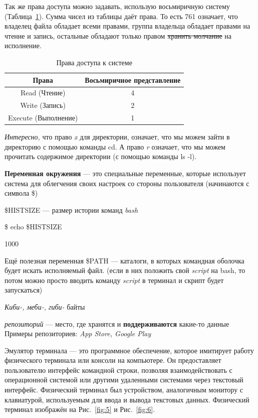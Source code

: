\documentclass[oneside, final, 14pt]{extreport} %
\begin{document}
Так же права доступа можно задавать, использую восьмиричную систему (Таблица~\ref{table:1}).
Сумма чисел из таблицы даёт права. То есть 761 означает, что владелец файла обладает всеми 
правами, группа владельца обладает правами на чтение и запись, остальные обладают только 
правом \sout{хранить молчание} на исполнение.



\begin{table}[h]
    \centering
    \begin{tabular}{|c|c|}
    \hline
    Права & Восьмиричное представление\\ 
    \hline
    Read (Чтение) & 4 \\ 
    \hline
    Write (Запись) & 2 \\
    \hline
    Execute (Выполнение) & 1 \\
    \hline
    \end{tabular}
    \caption{Права доступа к системе}
    \label{table:1}
\end{table}

\textit{Интересно,} что право \textit{x} для директории, означает, что мы можем зайти в директорию 
с помощью команды cd. А право \textit{r} означает, что мы можем прочитать содержимое директории (с 
помощью команды ls -l).



\textbf{Переменная окружения} --- это специальные переменные, которые использует система для
облегчения своих настроек со стороны пользователя (начинаются с символа \$) 

\$HISTSIZE --- размер истории команд \textit{bash}

\$ echo \$HISTSIZE 

1000

\vspace{\baselineskip}

Ещё полезная переменная \$PATH --- каталоги, в которых командная оболочка 
будет искать исполняемый файл. (если в них положить свой \textit{script} на bash,
то потом можно просто вводить команду \textit{script} в терминал и скрипт будет запускаться)

\textit{Киби-, меби-, гиби-} байты

\textit{репозиторий} --- место, где хранятся и \textbf{поддерживаются} какие-то данные
Примеры репозиториев: \textit{App Store, Google Play}

Эмулятор терминала — это программное обеспечение, которое имитирует работу физического терминала или консоли на компьютере. Он предоставляет пользователю интерфейс командной строки, позволяя взаимодействовать с операционной системой или другими удаленными системами через текстовый интерфейс.
Физический терминал был устройством, аналогичным монитору с клавиатурой, используемым для ввода и вывода текстовых данных. Физический терминал изображён на Рис.~\ref{fig:5} и Рис.~\ref{fig:6}.
\end{document}

